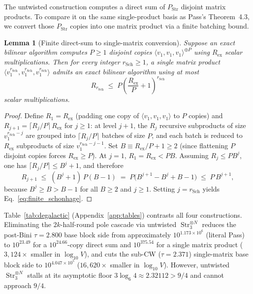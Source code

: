 \documentclass[11pt,a4paper]{article}
\theoremstyle{plain}
\newtheorem{lemma}[theorem]{Lemma}
\theoremstyle{definition}
\theoremstyle{remark}
\DeclareMathOperator{\Str}{Str}
\begin{document}
The untwisted construction computes a direct sum of $P_{\mathrm{Str}}$ disjoint matrix products. To compare it on the same single-product basis as Pass's Theorem~4.3, we convert those $P_{\mathrm{Str}}$ copies into one matrix product via a finite batching bound.

\begin{lemma}[Finite direct-sum to single-matrix conversion]
\label{lem:finite_schonhage}
Suppose an exact bilinear algorithm computes $P \ge 1$ disjoint copies $\langle v_1, v_1, v_1\rangle^{\oplus P}$ using $R_{\mathrm{ex}}$ scalar multiplications. Then for every integer $r_{\mathrm{Sch}} \ge 1$, a single matrix product $\langle v_1^{r_{\mathrm{Sch}}}, v_1^{r_{\mathrm{Sch}}}, v_1^{r_{\mathrm{Sch}}}\rangle$ admits an exact bilinear algorithm using at most
\begin{equation}
    R_{r_{\mathrm{Sch}}} \;\le\; P \left(\frac{R_{\mathrm{ex}}}{P} + 1\right)^{r_{\mathrm{Sch}}}
    \label{eq:finite_schonhage}
\end{equation}
scalar multiplications.
\end{lemma}
\begin{proof}
Define $R_1 = R_{\mathrm{ex}}$ (padding one copy of $\langle v_1, v_1, v_1\rangle$ to $P$ copies) and $R_{j+1} = \lceil R_j / P \rceil \, R_{\mathrm{ex}}$ for $j \ge 1$: at level $j + 1$, the $R_j$ recursive subproducts of size $v_1^{r_{\mathrm{Sch}} - j}$ are grouped into $\lceil R_j / P \rceil$ batches of size $P$, and each batch is reduced to $R_{\mathrm{ex}}$ subproducts of size $v_1^{r_{\mathrm{Sch}} - j - 1}$. Set $B \equiv R_{\mathrm{ex}}/P + 1 \ge 2$ (since flattening $P$ disjoint copies forces $R_{\mathrm{ex}} \ge P$). At $j = 1$, $R_1 = R_{\mathrm{ex}} < P B$. Assuming $R_j \le P B^j$, one has $\lceil R_j / P \rceil \le B^j + 1$, and therefore
\begin{equation}
    R_{j+1} \;\le\; (B^j + 1)\,P(B - 1) \;=\; P\bigl(B^{j+1} - B^j + B - 1\bigr) \;\le\; P\,B^{j+1} ,
    \label{eq:schonhage_induct}
\end{equation}
because $B^j \ge B > B - 1$ for all $B \ge 2$ and $j \ge 1$. Setting $j = r_{\mathrm{Sch}}$ yields Eq.~\eqref{eq:finite_schonhage}.
\end{proof}

Table~\ref{tab:degalactic} (Appendix~\ref{app:tables}) contrasts all four constructions. Eliminating the $2k$-half-round pole cascade via untwisted $\Str_3^{\otimes N}$ reduces the post-Bini $\tau = 2.800$ base block side from approximately $10^{1.173 \times 10^6}$ (literal Pass) to $10^{23.49}$ for a $10^{24.66}$-copy direct sum and $10^{375.54}$ for a single matrix product ($3{,}124\times$ smaller in $\log_{10} V$), and cuts the sub-CW ($\tau = 2.371$) single-matrix base block side to $10^{4.047 \times 10^5}$ ($16{,}620\times$ smaller in $\log_{10} V$). However, untwisted $\Str_3^{\otimes N}$ stalls at its asymptotic floor $3\log_6 4 \approx 2.32112 > 9/4$ and cannot approach $9/4$.
\end{document}
